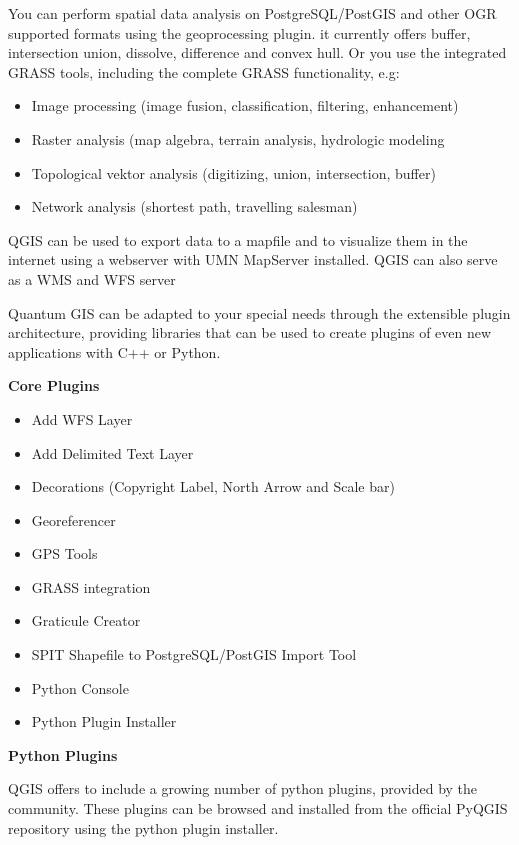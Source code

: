 
You can perform spatial data analysis on PostgreSQL/PostGIS and other OGR
supported formats using the geoprocessing plugin. it currently offers buffer,
intersection union, dissolve, difference and convex hull. Or you use the 
integrated GRASS tools, including the complete GRASS functionality, e.g:

\begin{itemize}
\item Image processing (image fusion, classification, filtering, enhancement)
\item Raster analysis (map algebra, terrain analysis, hydrologic modeling
\item Topological vektor analysis (digitizing, union, intersection, buffer)
\item Network analysis (shortest path, travelling salesman)
\end{itemize}


QGIS can be used to export data to a mapfile and to visualize them in the
internet using a webserver with UMN MapServer installed. QGIS can also
serve as a WMS and WFS server 


Quantum GIS can be adapted to your special needs through the extensible
plugin architecture, providing libraries that can be used to create plugins
of even new applications with C++ or Python.     

\textbf{Core Plugins}

\begin{itemize}
\item Add WFS Layer
\item Add Delimited Text Layer
\item Decorations (Copyright Label, North Arrow and Scale bar)
\item Georeferencer
\item GPS Tools
\item GRASS integration
\item Graticule Creator
\item SPIT Shapefile to PostgreSQL/PostGIS Import Tool
\item Python Console
\item Python Plugin Installer
\end{itemize}

\textbf{Python Plugins}

QGIS offers to include a growing number of python plugins, provided by the
community. These plugins can be browsed and installed from the official
PyQGIS repository using the python plugin installer.











